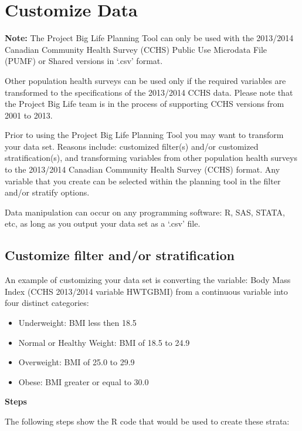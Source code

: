\documentclass[]{book}
\providecommand{\tightlist}{%
  \setlength{\itemsep}{0pt}\setlength{\parskip}{0pt}}
\begin{document}
\hypertarget{customize-data}{%
\section{Customize Data}\label{customize-data}}

\textbf{Note:} The Project Big Life Planning Tool can only be used with the 2013/2014 Canadian Community Health Survey (CCHS) Public Use Microdata File (PUMF) or Shared versions in `.csv' format.

Other population health surveys can be used only if the required variables are transformed to the specifications of the 2013/2014 CCHS data. Please note that the Project Big Life team is in the process of supporting CCHS versions from 2001 to 2013.

Prior to using the Project Big Life Planning Tool you may want to transform your data set. Reasons include: customized filter(s) and/or customized stratification(s), and transforming variables from other population health surveys to the 2013/2014 Canadian Community Health Survey (CCHS) format. Any variable that you create can be selected within the planning tool in the filter and/or stratify options.

Data manipulation can occur on any programming software: R, SAS, STATA, etc, as long as you output your data set as a `.csv' file.

\hypertarget{customize-filter-andor-stratification}{%
\subsection{Customize filter and/or stratification}\label{customize-filter-andor-stratification}}

An example of customizing your data set is converting the variable: Body Mass Index (CCHS 2013/2014 variable HWTGBMI) from a continuous variable into four distinct categories:

\begin{itemize}
\tightlist
\item
  Underweight: BMI less then 18.5
\item
  Normal or Healthy Weight: BMI of 18.5 to 24.9
\item
  Overweight: BMI of 25.0 to 29.9
\item
  Obese: BMI greater or equal to 30.0
\end{itemize}

\textbf{Steps}

The following steps show the R code that would be used to create these strata:
\end{document}
